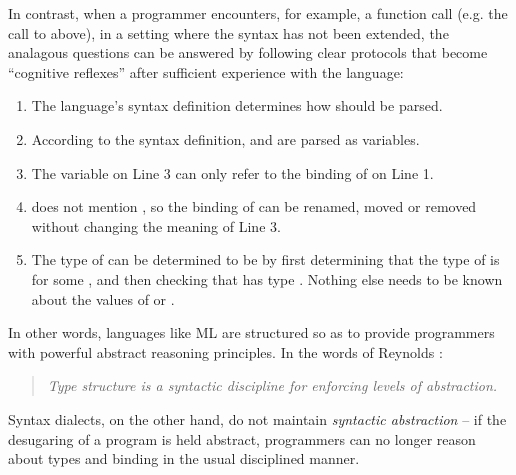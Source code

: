
In contrast, when a programmer encounters, for example, a function call (e.g. the call to  above), in a setting where the syntax has not been extended, the analagous questions can be answered by following clear protocols that become ``cognitive reflexes'' after sufficient experience with the language:
\begin{enumerate}
\item The language's syntax definition determines how  should be parsed.
\item According to the syntax definition,  and  are parsed as variables.
\item The variable  on Line 3 can only refer to the binding of  on Line 1.
\item {} does not mention , so the binding of  can be renamed, moved or removed without changing the meaning of Line 3.
\item The type of  can be determined to be  by first determining that the type of  is  for some , and then checking that  has type . Nothing else needs to be known about the values of  or . 
\end{enumerate}

In other words, languages like ML are structured so as to provide programmers with powerful abstract reasoning principles. In the words of Reynolds \cite{B304}:
\begin{quote}
\emph{Type structure is a syntactic discipline for enforcing levels of abstraction.}
\end{quote}

Syntax dialects, on the other hand, do not maintain \emph{syntactic abstraction} -- if the desugaring of a program is held abstract, programmers can no longer reason about types and binding in the usual disciplined manner.


